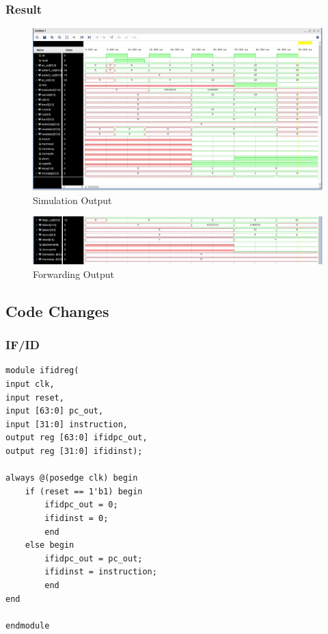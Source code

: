 \documentclass{article}
\begin{document}
\subsubsection{Result}

\begin{figure} [h]
    \centering 
    \includegraphics[width=1\textwidth]{task 2 simulation.jpg} 
    \caption{Simulation Output} 
    \label{fig:Output 2} 
\end{figure}
\begin{figure} [h]
    \centering 
    \includegraphics[width=1\textwidth]{task 2 forwarding.jpg} 
    \caption{Forwarding Output} 
    \label{fig:Output 3} 
\end{figure}
\subsection{Code Changes}
\subsubsection{IF/ID}
\begin{lstlisting}[caption={Design Module for IF/ID}, captionpos=b, language=RISC-V]
module ifidreg(
input clk,
input reset,
input [63:0] pc_out,
input [31:0] instruction,
output reg [63:0] ifidpc_out,
output reg [31:0] ifidinst);

always @(posedge clk) begin
    if (reset == 1'b1) begin
        ifidpc_out = 0;
        ifidinst = 0;
        end
    else begin
        ifidpc_out = pc_out;
        ifidinst = instruction;
        end
end

endmodule
\end{lstlisting}
\end{document}
